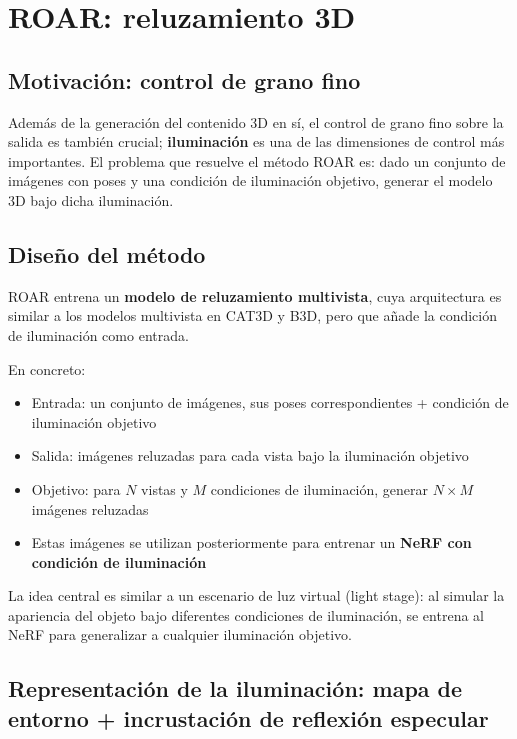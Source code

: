 \section{ROAR: reluzamiento 3D}

\subsection{Motivación: control de grano fino}

Además de la generación del contenido 3D en sí, el control de grano fino sobre la salida es también crucial; \textbf{iluminación} es una de las dimensiones de control más importantes. El problema que resuelve el método ROAR es: dado un conjunto de imágenes con poses y una condición de iluminación objetivo, generar el modelo 3D bajo dicha iluminación.

\subsection{Diseño del método}

ROAR entrena un \textbf{modelo de reluzamiento multivista}, cuya arquitectura es similar a los modelos multivista en CAT3D y B3D, pero que añade la condición de iluminación como entrada.

En concreto:
\begin{itemize}
    \item Entrada: un conjunto de imágenes, sus poses correspondientes + condición de iluminación objetivo
    \item Salida: imágenes reluzadas para cada vista bajo la iluminación objetivo
    \item Objetivo: para $N$ vistas y $M$ condiciones de iluminación, generar $N \times M$ imágenes reluzadas
    \item Estas imágenes se utilizan posteriormente para entrenar un \textbf{NeRF con condición de iluminación}
\end{itemize}

La idea central es similar a un escenario de luz virtual (light stage): al simular la apariencia del objeto bajo diferentes condiciones de iluminación, se entrena al NeRF para generalizar a cualquier iluminación objetivo.

\subsection{Representación de la iluminación: mapa de entorno + incrustación de reflexión especular}

